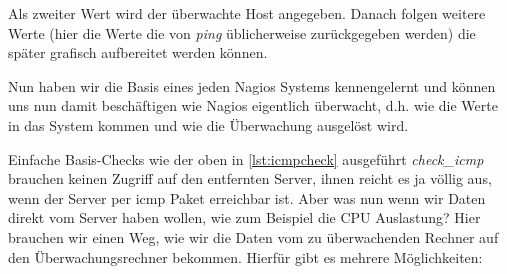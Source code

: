 \documentclass[12pt,a4paper,parskip,listof=totoc,bibliography=totoc]{scrreprt}
\begin{document}
	Als zweiter Wert wird der überwachte Host angegeben. Danach folgen weitere Werte (hier die Werte die von \textit{ping} üblicherweise zurückgegeben werden) die später grafisch aufbereitet werden können.
	
	Nun haben wir die Basis eines jeden Nagios Systems kennengelernt und können uns nun damit beschäftigen wie Nagios eigentlich überwacht, d.h. wie die Werte in das System kommen und wie die Überwachung ausgelöst wird.
	
	Einfache Basis-Checks wie der oben in \ref{lst:icmpcheck} ausgeführt \textit{check\_icmp} brauchen keinen Zugriff auf den entfernten Server, ihnen reicht es ja völlig aus, wenn der Server per \acrfull{icmp} Paket erreichbar ist. Aber was nun wenn wir Daten direkt vom Server haben wollen, wie zum Beispiel die CPU Auslastung? Hier brauchen wir einen Weg, wie wir die Daten vom zu überwachenden Rechner auf den Überwachungsrechner bekommen. Hierfür gibt es mehrere Möglichkeiten:
	
\end{document}
